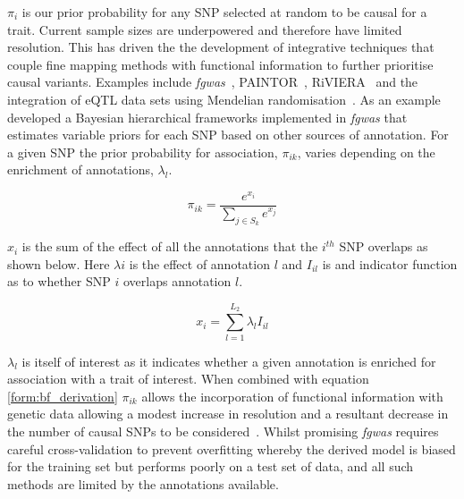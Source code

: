 \documentclass[a4paper,11pt]{report}
\begin{document}
$\pi_{i}$ is our prior probability for any SNP selected at random to be causal for a trait. Current sample sizes are underpowered and therefore have limited resolution. This has driven the the development of integrative techniques that couple fine mapping methods with functional information to further prioritise causal variants. Examples include \textit{fgwas}~\citep{Pickrell2014-xs}, PAINTOR~\citep{KichaevYangLindstromEtAl2014}, RiVIERA~\citep{LiKellis2016}   and the integration of eQTL data sets using Mendelian randomisation~\citep{ZhuZhangHuEtAl2016}. As an example ~\citet{Pickrell2014-xs} developed a Bayesian hierarchical frameworks implemented in \textit{fgwas} that estimates variable priors for each SNP based on other sources of annotation. For a given SNP the prior probability for association, $\pi_{ik}$, varies depending on the enrichment of annotations, $\lambda_{l}$. 

\begin{equation}
	\pi_{ik} = \frac{e^{x_{i}}}{\sum_{j \in S_k}e^{x_{j}}}
	\label{eqn:fgwas_var_prior}
\end{equation}

$x_i$ is the sum of the effect of all the annotations that the $i^{th}$ SNP overlaps as shown below.  Here $\lambda{i}$ is the effect of annotation $l$ and $I_{il}$ is and indicator function as to whether SNP $i$ overlaps annotation $l$.  

\begin{equation}
	x_{i} = \sum_{l=1}^{L_{2}} \lambda_{l}I_{il}
	\label{eqn:fgwas_lambda}
\end{equation}

$\lambda_{l}$ is itself of interest as it indicates whether a given annotation is enriched for association with a trait of interest. When combined with equation \ref{form:bf_derivation} $\pi_{ik}$ allows the incorporation of functional information with genetic data allowing a modest increase in resolution and a resultant decrease in the number of causal SNPs to be considered~\citep{Pickrell2014-xs}. Whilst promising \textit{fgwas} requires careful cross-validation to prevent overfitting whereby the derived model is biased for the training set but performs poorly on a test set of data, and all such methods are limited by the annotations available.
\end{document}
